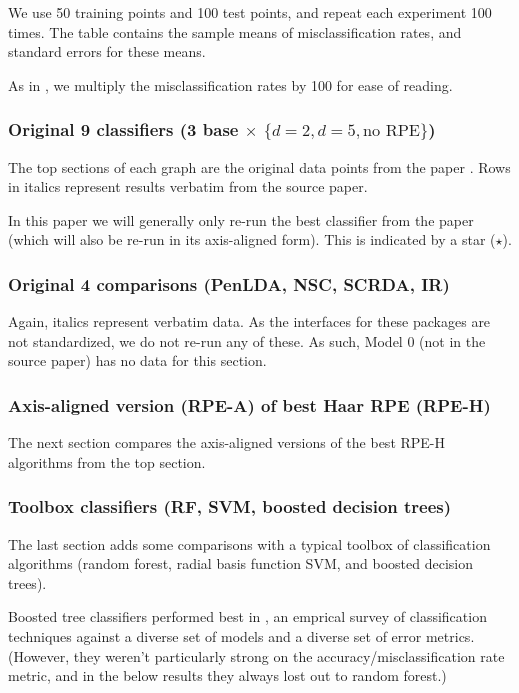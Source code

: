 \documentclass{amsart}
\begin{document}
We use 50 training points and 100 test points, and repeat each experiment
100 times. The table contains the sample means of misclassification
rates, and standard errors for these means.

As in \cite{CS15}, we multiply the misclassification rates by 100 for ease of reading.


\subsubsection{Original 9 classifiers (3 base $\times$ $\{d=2,d=5,\text{no RPE}\}$)}

The top sections of each graph are the original data points from the
paper \cite{CS15}. Rows in italics represent results verbatim from
the source paper.

In this paper we will generally only re-run the best classifier from
the paper (which will also be re-run in its axis-aligned form).
This is indicated by a star ($\star$).


\subsubsection{Original 4 comparisons (PenLDA, NSC, SCRDA, IR)}

Again, italics represent verbatim data. As the interfaces for these
packages are not standardized, we do not re-run any of these.
As such, Model 0 (not in the source paper) has no data for this section.


\subsubsection{Axis-aligned version (RPE-A) of best Haar RPE (RPE-H)}

The next section compares the axis-aligned versions of the best RPE-H
algorithms from the top section.


\subsubsection{Toolbox classifiers (RF, SVM, boosted decision trees)}

The last section adds some comparisons with a typical toolbox of classification
algorithms (random forest, radial basis function SVM, and boosted
decision trees).

Boosted tree classifiers performed best in \cite{CN06}, an emprical
survey of classification techniques against a diverse set of models
and a diverse set of error metrics. (However, they weren't particularly
strong on the accuracy/misclassification rate metric, and in the below
results they always lost out to random forest.)
\end{document}
